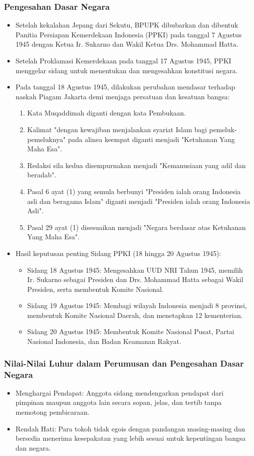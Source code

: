 \subsubsection{Pengesahan Dasar Negara}
\begin{itemize}
\item Setelah kekalahan Jepang dari Sekutu, BPUPK dibubarkan dan dibentuk Panitia Persiapan Kemerdekaan Indonesia (PPKI) pada tanggal 7 Agustus 1945 dengan Ketua Ir. Sukarno dan Wakil Ketua Drs. Mohammad Hatta.
\item Setelah Proklamasi Kemerdekaan pada tanggal 17 Agustus 1945, PPKI menggelar sidang untuk menentukan dan mengesahkan konstitusi negara.
\item Pada tanggal 18 Agustus 1945, dilakukan perubahan mendasar terhadap naskah Piagam Jakarta demi menjaga persatuan dan kesatuan bangsa:
  \begin{enumerate}
  \item Kata Muqaddimah diganti dengan kata Pembukaan.
  \item Kalimat "dengan kewajiban menjalankan syariat Islam bagi pemeluk-pemeluknya" pada alinea keempat diganti menjadi "Ketuhanan Yang Maha Esa".
  \item Redaksi sila kedua disempurnakan menjadi "Kemanusiaan yang adil dan beradab".
  \item Pasal 6 ayat (1) yang semula berbunyi "Presiden ialah orang Indonesia asli dan beragama Islam" diganti menjadi "Presiden ialah orang Indonesia Asli".
  \item Pasal 29 ayat (1) disesuaikan menjadi "Negara berdasar atas Ketuhanan Yang Maha Esa".
  \end{enumerate}
\item Hasil keputusan penting Sidang PPKI (18 hingga 20 Agustus 1945):
  \begin{itemize}
  \item Sidang 18 Agustus 1945: Mengesahkan UUD NRI Tahun 1945, memilih Ir. Sukarno sebagai Presiden dan Drs. Mohammad Hatta sebagai Wakil Presiden, serta membentuk Komite Nasional.
  \item Sidang 19 Agustus 1945: Membagi wilayah Indonesia menjadi 8 provinsi, membentuk Komite Nasional Daerah, dan menetapkan 12 kementerian.
  \item Sidang 20 Agustus 1945: Membentuk Komite Nasional Pusat, Partai Nasional Indonesia, dan Badan Keamanan Rakyat.
  \end{itemize}
\end{itemize}

\subsubsection{ Nilai-Nilai Luhur dalam Perumusan dan Pengesahan Dasar Negara}
\begin{itemize}
\item Menghargai Pendapat: Anggota sidang mendengarkan pendapat dari pimpinan maupun anggota lain secara sopan, jelas, dan tertib tanpa memotong pembicaraan.
\item Rendah Hati: Para tokoh tidak egois dengan pandangan masing-masing dan bersedia menerima kesepakatan yang lebih sesuai untuk kepentingan bangsa dan negara.
\end{itemize}
